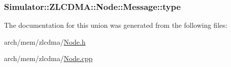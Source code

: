 \hypertarget{union_simulator_1_1_z_l_c_d_m_a_1_1_node_1_1_message_adef32143d77295adc3b9535824a7f191}{
\subsubsection[{type}]{ Simulator\+::\+Z\+L\+C\+D\+M\+A\+::\+Node\+::\+Message\+::type}}\label{union_simulator_1_1_z_l_c_d_m_a_1_1_node_1_1_message_adef32143d77295adc3b9535824a7f191}


The documentation for this union was generated from the following files\+:\begin{DoxyCompactItemize}
\item 
arch/mem/zlcdma/\hyperlink{zlcdma_2_node_8h}{Node.\+h}\item 
arch/mem/zlcdma/\hyperlink{zlcdma_2_node_8cpp}{Node.\+cpp}\end{DoxyCompactItemize}
